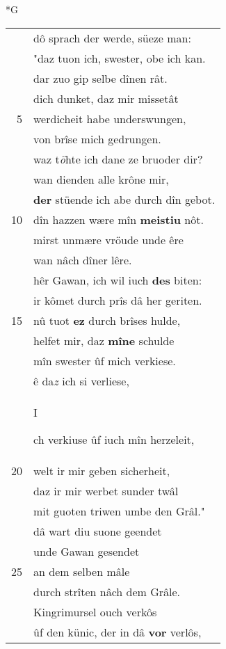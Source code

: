 \documentclass[8pt,a4paper,notitlepage]{article}
\begin{document}
\newpage
\begin{table}[ht]
\begin{minipage}[t]{0.5\linewidth}
\small
\begin{center}*G
\end{center}
\begin{tabular}{rl}
 & dô sprach der werde, süeze man:\\ 
 & "daz tuon ich, swester, obe ich kan.\\ 
 & dar zuo gip selbe dînen rât.\\ 
 & dich dunket, daz mir missetât\\ 
5 & werdicheit habe underswungen,\\ 
 & von brîse mich gedrungen.\\ 
 & waz t\textit{ö}hte ich dane ze bruoder dir?\\ 
 & wan dienden alle krône mir,\\ 
 & \textbf{der} stüende ich abe durch dîn gebot.\\ 
10 & dîn hazzen wære mîn \textbf{meistiu} nôt.\\ 
 & mirst unmære vröude unde êre\\ 
 & wan nâch dîner lêre.\\ 
 & hêr Gawan, ich wil iuch \textbf{des} biten:\\ 
 & ir kômet durch prîs dâ her geriten.\\ 
15 & nû tuot \textbf{ez} durch brîses hulde,\\ 
 & helfet mir, daz \textbf{mîne} schulde\\ 
 & mîn swester ûf mich verkiese.\\ 
 & ê da\textit{z} ich si verliese,\\ 
 & \begin{large}I\end{large}ch verkiuse ûf iuch mîn herzeleit,\\ 
20 & welt ir mir geben sicherheit,\\ 
 & daz ir mir werbet sunder twâl\\ 
 & mit guoten triwen umbe den Grâl."\\ 
 & dâ wart diu suone geendet\\ 
 & unde Gawan gesendet\\ 
25 & an dem selben mâle\\ 
 & durch strîten nâch dem Grâle.\\ 
 & Kingrimursel ouch verkôs\\ 
 & ûf den künic, der in dâ \textbf{vor} verlôs,\\ 

\end{tabular}
\end{minipage}
\end{table}
\end{document}

